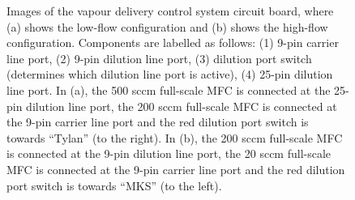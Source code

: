 \documentclass[
  a4paper,
]{scrbook}
\begin{document}
\begin{figure}
\begin{minipage}[t]{0.49\linewidth}
{}

\end{minipage}%

\caption{\label{fig-vapour-sensor-pcb}Images of the vapour delivery
control system circuit board, where (a) shows the low-flow configuration
and (b) shows the high-flow configuration. Components are labelled as
follows: (1) 9-pin carrier line port, (2) 9-pin dilution line port, (3)
dilution port switch (determines which dilution line port is active),
(4) 25-pin dilution line port. In (a), the 500 sccm full-scale MFC is
connected at the 25-pin dilution line port, the 200 sccm full-scale MFC
is connected at the 9-pin carrier line port and the red dilution port
switch is towards ``Tylan'' (to the right). In (b), the 200 sccm
full-scale MFC is connected at the 9-pin dilution line port, the 20 sccm
full-scale MFC is connected at the 9-pin carrier line port and the red
dilution port switch is towards ``MKS'' (to the left).}

\end{figure}
\end{document}
